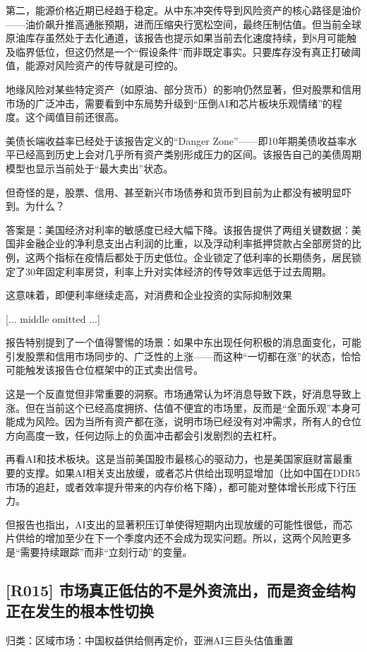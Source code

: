 \documentclass[11pt]{ctexart}
\begin{document}
第二，能源价格近期已经趋于稳定。从中东冲突传导到风险资产的核心路径是油价——油价飙升推高通胀预期，进而压缩央行宽松空间，最终压制估值。但当前全球原油库存虽然处于去化通道，该报告也提示如果当前去化速度持续，到8月可能触及临界低位，但这仍然是一个“假设条件”而非既定事实。只要库存没有真正打破阈值，能源对风险资产的传导就是可控的。

地缘风险对某些特定资产（如原油、部分货币）的影响仍然显著，但对股票和信用市场的广泛冲击，需要看到中东局势升级到“压倒AI和芯片板块乐观情绪”的程度。这个阈值目前还很高。

美债长端收益率已经处于该报告定义的“Danger Zone”——即10年期美债收益率水平已经高到历史上会对几乎所有资产类别形成压力的区间。该报告自己的美债周期模型也显示当前处于“最大卖出”状态。

但奇怪的是，股票、信用、甚至新兴市场债券和货币到目前为止都没有被明显吓到。为什么？

答案是：美国经济对利率的敏感度已经大幅下降。该报告提供了两组关键数据：美国非金融企业的净利息支出占利润的比重，以及浮动利率抵押贷款占全部房贷的比例，这两个指标在疫情后都处于历史低位。企业锁定了低利率的长期债务，居民锁定了30年固定利率房贷，利率上升对实体经济的传导效率远低于过去周期。

这意味着，即便利率继续走高，对消费和企业投资的实际抑制效果

[... middle omitted ...]

报告特别提到了一个值得警惕的场景：如果中东出现任何积极的消息面变化，可能引发股票和信用市场同步的、广泛性的上涨——而这种“一切都在涨”的状态，恰恰可能触发该报告仓位框架中的正式卖出信号。

这是一个反直觉但非常重要的洞察。市场通常认为坏消息导致下跌，好消息导致上涨。但在当前这个已经高度拥挤、估值不便宜的市场里，反而是“全面乐观”本身可能成为风险。因为当所有资产都在涨，说明市场已经没有对冲需求，所有人的仓位方向高度一致，任何边际上的负面冲击都会引发剧烈的去杠杆。

再看AI和技术板块。这是当前美国股市最核心的驱动力，也是美国家庭财富最重要的支撑。如果AI相关支出放缓，或者芯片供给出现明显增加（比如中国在DDR5市场的追赶，或者效率提升带来的内存价格下降），都可能对整体增长形成下行压力。

但报告也指出，AI支出的显著积压订单使得短期内出现放缓的可能性很低，而芯片供给的增加至少在下一个季度内还不会成为现实问题。所以，这两个风险更多是“需要持续跟踪”而非“立刻行动”的变量。

\subsection{[R015] 市场真正低估的不是外资流出，而是资金结构正在发生的根本性切换}
{\small\color{refgray}归类：区域市场：中国权益供给侧再定价，亚洲AI三巨头估值重置}
\end{document}

